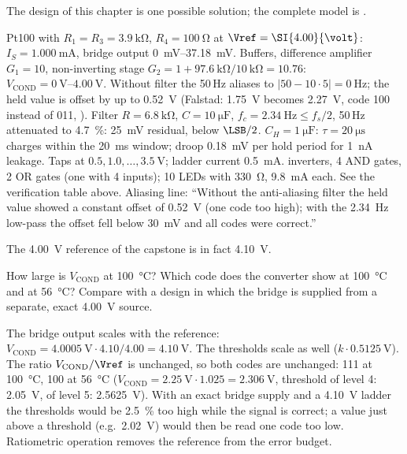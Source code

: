 \begin{solution}
The design of this chapter is one possible solution; the complete model
is .
\begin{talist}
\ta Pt100 with $R_1=R_3=\SI{3.9}{\kilo\ohm}$, $R_4=\SI{100}{\ohm}$ at
	$\Vref=\SI{4.00}{\volt}$: $I_S = \SI{1.000}{\milli\ampere}$, bridge
	output \SIrange{0}{37.18}{\milli\volt}. Buffers, difference amplifier
	$G_1=10$, non-inverting stage $G_2 = 1+\SI{97.6}{\kilo\ohm}/\SI{10}{\kilo\ohm}=10.76$:
	$V_\mathrm{COND} = \SIrange{0}{4.00}{\volt}$.
\ta Without filter the 50\,Hz aliases to
	$|50-10\cdot5| = \SI{0}{\hertz}$; the held value is offset by up to
	\SI{0.52}{\volt} (Falstad: \SI{1.75}{\volt} becomes \SI{2.27}{\volt},
	code 100 instead of 011, ). Filter
	$R=\SI{6.8}{\kilo\ohm}$, $C=\SI{10}{\micro\farad}$, $f_c=\SI{2.34}{\hertz}\leq f_s/2$,
	50\,Hz attenuated to \SI{4.7}{\percent}: \SI{25}{\milli\volt} residual,
	below $\LSB/2$.
\ta $C_H=\SI{1}{\micro\farad}$: $\tau = \SI{20}{\micro\second}$ charges
	within the \SI{20}{\milli\second} window; droop
	\SI{0.18}{\milli\volt} per hold period for \SI{1}{\nano\ampere} leakage.
\ta Taps at $0.5, 1.0, \ldots, \SI{3.5}{\volt}$; ladder current
	\SI{0.5}{\milli\ampere}.
 inverters, 4 AND gates, 2 OR gates (one with 4 inputs);
	10 LEDs with \SI{330}{\ohm}, \SI{9.8}{\milli\ampere} each.
\ta See the verification table above. Aliasing line: ``Without the
	anti-aliasing filter the held value showed a constant offset of
	\SI{+0.52}{\volt} (one code too high); with the \SI{2.34}{\hertz}
	low-pass the offset fell below \SI{30}{\milli\volt} and all codes were
	correct.''
\end{talist}
\end{solution}

The \SI{4.00}{\volt} reference of the capstone is in fact \SI{4.10}{\volt}.
\begin{talist}
\ta How large is $V_\mathrm{COND}$ at \SI{100}{\celsius}?
\ta Which code does the converter show at \SI{100}{\celsius} and at
	\SI{56}{\celsius}? Compare with a design in which the bridge is supplied
	from a separate, exact \SI{4.00}{\volt} source.
\end{talist}

\begin{solution}
\begin{talist}
\ta The bridge output scales with the reference:
	$V_\mathrm{COND} = \SI{4.0005}{\volt}\cdot 4.10/4.00 = \SI{4.10}{\volt}$.
\ta The thresholds scale as well ($k\cdot\SI{0.5125}{\volt}$). The ratio
	$V_\mathrm{COND}/\Vref$ is unchanged, so both codes are unchanged: 111 at
	\SI{100}{\celsius}, 100 at \SI{56}{\celsius} ($V_\mathrm{COND} =
	\SI{2.25}{\volt}\cdot1.025 = \SI{2.306}{\volt}$, threshold of level 4:
	\SI{2.05}{\volt}, of level 5: \SI{2.5625}{\volt}). With an exact bridge
	supply and a \SI{4.10}{\volt} ladder the thresholds would be
	\SI{2.5}{\percent} too high while the signal is correct; a value just
	above a threshold (e.g.\ \SI{2.02}{\volt}) would then be read one code
	too low. Ratiometric operation removes the reference from the error
	budget.
\end{talist}
\end{solution}

